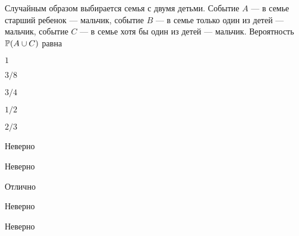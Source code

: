 
\begin{question}
Случайным образом выбирается семья с двумя детьми. Событие \(A\) — в
семье старший ребенок — мальчик, событие \(B\) — в семье только один
из детей — мальчик, событие \(C\) — в семье хотя бы один из детей
--- мальчик. Вероятность \(\P(A \cup C)\) равна
\begin{answerlist}
  \item \(1\)
  \item \(3/8\)
  \item \(3/4\)
  \item \(1/2\)
  \item \(2/3\)
\end{answerlist}
\end{question}

\begin{solution}
\begin{answerlist}
  \item Неверно
  \item Неверно
  \item Отлично
  \item Неверно
  \item Неверно
\end{answerlist}
\end{solution}

